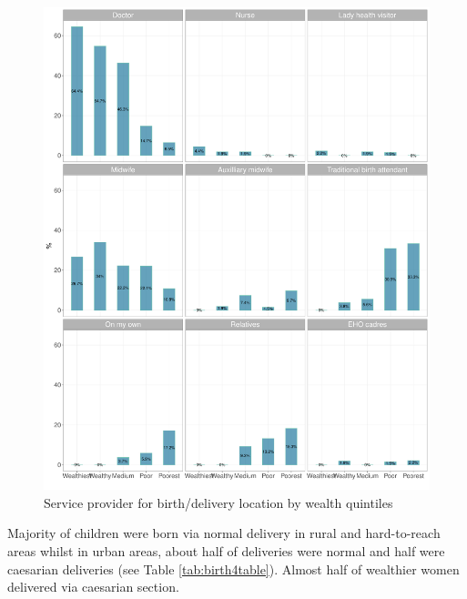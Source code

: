 \documentclass[12pt,a4paper]{article}
\begin{document}
\begin{figure}[H]

{\centering \includegraphics{kayahReport_files/figure-latex/birth6Plot-1} 

}

\caption{Service provider for birth/delivery location by wealth quintiles}\label{fig:birth6Plot}
\end{figure}

Majority of children were born via normal delivery in rural and hard-to-reach areas whilst in urban areas, about half of deliveries were normal and half were caesarian deliveries (see Table \ref{tab:birth4table}). Almost half of wealthier women delivered via caesarian section.
\end{document}
